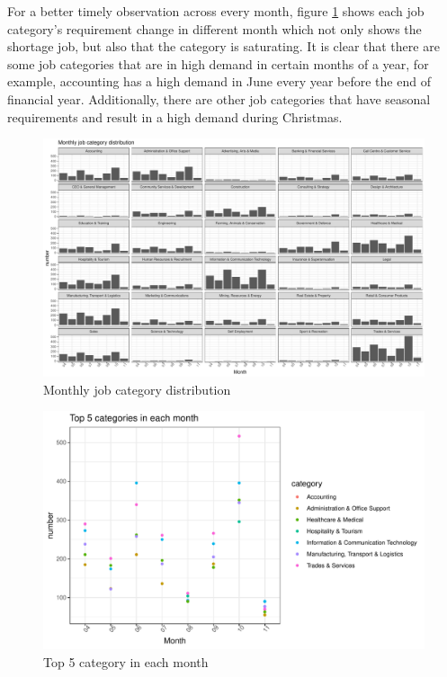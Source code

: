 \documentclass[11pt,a4paper,]{article}
\begin{document}
For a better timely observation across every month, figure \ref{fig:monthly} shows each job category's requirement change in different month which not only shows the shortage job, but also that the category is saturating. It is clear that there are some job categories that are in high demand in certain months of a year, for example, accounting has a high demand in June every year before the end of financial year. Additionally, there are other job categories that have seasonal requirements and result in a high demand during Christmas.

\begin{figure}
\centering
\includegraphics{Team_JHDP_Assignment4_files/figure-latex/monthly-1.pdf}
\caption{\label{fig:monthly}Monthly job category distribution}
\end{figure}

\begin{figure}
\centering
\includegraphics{Team_JHDP_Assignment4_files/figure-latex/number-1.pdf}
\caption{\label{fig:number}Top 5 category in each month}
\end{figure}
\end{document}
